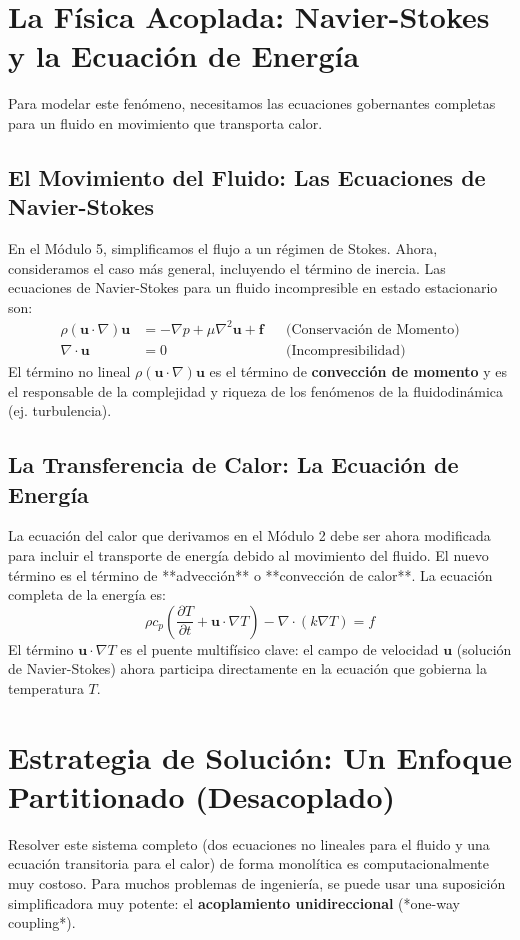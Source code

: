 \section{La Física Acoplada: Navier-Stokes y la Ecuación de Energía}
Para modelar este fenómeno, necesitamos las ecuaciones gobernantes completas para un fluido en movimiento que transporta calor.

\subsection{El Movimiento del Fluido: Las Ecuaciones de Navier-Stokes}
En el Módulo 5, simplificamos el flujo a un régimen de Stokes. Ahora, consideramos el caso más general, incluyendo el término de inercia. Las ecuaciones de Navier-Stokes para un fluido incompresible en estado estacionario son:
\begin{align}
    \rho (\mathbf{u} \cdot \nabla) \mathbf{u} &= -\nabla p + \mu \nabla^2 \mathbf{u} + \mathbf{f} && \text{(Conservación de Momento)} \\
    \nabla \cdot \mathbf{u} &= 0 && \text{(Incompresibilidad)}
\end{align}
El término no lineal $\rho (\mathbf{u} \cdot \nabla) \mathbf{u}$ es el término de \textbf{convección de momento} y es el responsable de la complejidad y riqueza de los fenómenos de la fluidodinámica (ej. turbulencia).

\subsection{La Transferencia de Calor: La Ecuación de Energía}
La ecuación del calor que derivamos en el Módulo 2 debe ser ahora modificada para incluir el transporte de energía debido al movimiento del fluido. El nuevo término es el término de **advección** o **convección de calor**. La ecuación completa de la energía es:
\begin{equation}
    \rho c_p \left( \frac{\partial T}{\partial t} + \mathbf{u} \cdot \nabla T \right) - \nabla \cdot (k \nabla T) = f
\end{equation}
El término $\mathbf{u} \cdot \nabla T$ es el puente multifísico clave: el campo de velocidad $\mathbf{u}$ (solución de Navier-Stokes) ahora participa directamente en la ecuación que gobierna la temperatura $T$.

\section{Estrategia de Solución: Un Enfoque Partitionado (Desacoplado)}
Resolver este sistema completo (dos ecuaciones no lineales para el fluido y una ecuación transitoria para el calor) de forma monolítica es computacionalmente muy costoso. Para muchos problemas de ingeniería, se puede usar una suposición simplificadora muy potente: el \textbf{acoplamiento unidireccional} (*one-way coupling*).

